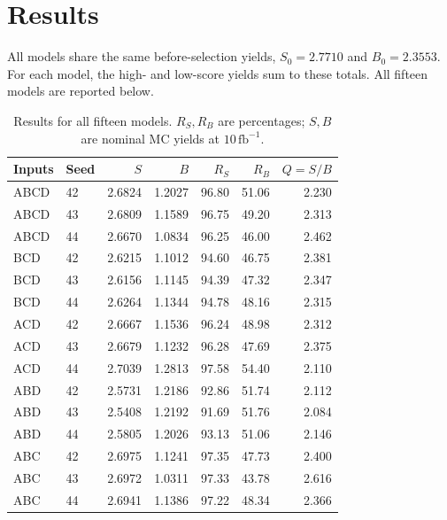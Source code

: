 \documentclass[11pt,a4paper]{article}
\begin{document}
\section{Results}\label{sec:results}
All models share the same before-selection yields, $S_0=2.7710$ and $B_0=2.3553$.
For each model, the high- and low-score yields sum to these totals.
All fifteen models are reported below.

\begin{table}[H]
\caption{Results for all fifteen models. $R_S,R_B$ are percentages; $S,B$ are nominal MC yields at $10\,\mathrm{fb}^{-1}$.}
\label{tab:basic-all}
\centering\small
\begin{tabular}{llrrrrr}
\toprule
Inputs & Seed & $S$ & $B$ & $R_S$ & $R_B$ & $Q=S/B$ \\
\midrule
ABCD & 42 & 2.6824 & 1.2027 & 96.80 & 51.06 & 2.230 \\
ABCD & 43 & 2.6809 & 1.1589 & 96.75 & 49.20 & 2.313 \\
ABCD & 44 & 2.6670 & 1.0834 & 96.25 & 46.00 & 2.462 \\
\addlinespace
BCD & 42 & 2.6215 & 1.1012 & 94.60 & 46.75 & 2.381 \\
BCD & 43 & 2.6156 & 1.1145 & 94.39 & 47.32 & 2.347 \\
BCD & 44 & 2.6264 & 1.1344 & 94.78 & 48.16 & 2.315 \\
\addlinespace
ACD & 42 & 2.6667 & 1.1536 & 96.24 & 48.98 & 2.312 \\
ACD & 43 & 2.6679 & 1.1232 & 96.28 & 47.69 & 2.375 \\
ACD & 44 & 2.7039 & 1.2813 & 97.58 & 54.40 & 2.110 \\
\addlinespace
ABD & 42 & 2.5731 & 1.2186 & 92.86 & 51.74 & 2.112 \\
ABD & 43 & 2.5408 & 1.2192 & 91.69 & 51.76 & 2.084 \\
ABD & 44 & 2.5805 & 1.2026 & 93.13 & 51.06 & 2.146 \\
\addlinespace
ABC & 42 & 2.6975 & 1.1241 & 97.35 & 47.73 & 2.400 \\
ABC & 43 & 2.6972 & 1.0311 & 97.33 & 43.78 & 2.616 \\
ABC & 44 & 2.6941 & 1.1386 & 97.22 & 48.34 & 2.366 \\
\bottomrule
\end{tabular}
\end{table}
\end{document}
